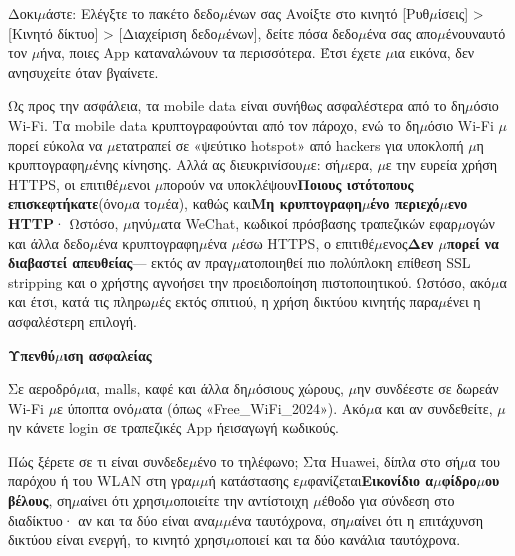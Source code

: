 \begin{tcbpractice}{Δοκι$\mu$άστε: Ελέγξτε το πακέτο δεδο$\mu$ένων σας}
Ανοίξτε στο κινητό [Ρυθ$\mu$ίσεις] > [Κινητό δίκτυο] > [Διαχείριση δεδο$\mu$ένων], δείτε πόσα δεδο$\mu$ένα σας απο$\mu$ένουναυτό τον $\mu$ήνα, ποιες App καταναλώνουν τα περισσότερα. Έτσι έχετε $\mu$ια εικόνα, δεν ανησυχείτε όταν βγαίνετε.

\end{tcbpractice}


Ως προς την ασφάλεια, τα mobile data είναι συνήθως ασφαλέστερα από το δη$\mu$όσιο Wi-Fi. Τα mobile data κρυπτογραφούνται από τον πάροχο, ενώ το δη$\mu$όσιο Wi-Fi $\mu$πορεί εύκολα να $\mu$ετατραπεί σε «ψεύτικο hotspot» από hackers για υποκλοπή $\mu$η κρυπτογραφη$\mu$ένης κίνησης. Αλλά ας διευκρινίσου$\mu$ε: σή$\mu$ερα, $\mu$ε την ευρεία χρήση HTTPS, οι επιτιθέ$\mu$ενοι $\mu$πορούν να υποκλέψουν\textbf{Ποιους ιστότοπους επισκεφτήκατε}(όνο$\mu$α το$\mu$έα), καθώς και\textbf{Μη κρυπτογραφη$\mu$ένο περιεχό$\mu$ενο HTTP}· Ωστόσο, $\mu$ηνύ$\mu$ατα WeChat, κωδικοί πρόσβασης τραπεζικών εφαρ$\mu$ογών και άλλα δεδο$\mu$ένα κρυπτογραφη$\mu$ένα $\mu$έσω HTTPS, ο επιτιθέ$\mu$ενος\textbf{Δεν $\mu$πορεί να διαβαστεί απευθείας}— εκτός αν πραγ$\mu$ατοποιηθεί πιο πολύπλοκη επίθεση SSL stripping και ο χρήστης αγνοήσει την προειδοποίηση πιστοποιητικού. Ωστόσο, ακό$\mu$α και έτσι, κατά τις πληρω$\mu$ές εκτός σπιτιού, η χρήση δικτύου κινητής παρα$\mu$ένει η ασφαλέστερη επιλογή.

\textbf{Υπενθύ$\mu$ιση ασφαλείας}\par

Σε αεροδρό$\mu$ια, malls, καφέ και άλλα δη$\mu$όσιους χώρους, $\mu$ην συνδέεστε σε δωρεάν Wi-Fi $\mu$ε ύποπτα ονό$\mu$ατα (όπως «Free\_WiFi\_2024»). Ακό$\mu$α και αν συνδεθείτε, $\mu$ην κάνετε login σε τραπεζικές App ήεισαγωγή κωδικούς.


Πώς ξέρετε σε τι είναι συνδεδε$\mu$ένο το τηλέφωνο; Στα Huawei, δίπλα στο σή$\mu$α του παρόχου ή του WLAN στη γρα$\mu$$\mu$ή κατάστασης ε$\mu$φανίζεται\textbf{Εικονίδιο α$\mu$φίδρο$\mu$ου βέλους}, ση$\mu$αίνει ότι χρησι$\mu$οποιείτε την αντίστοιχη $\mu$έθοδο για σύνδεση στο διαδίκτυο· αν και τα δύο είναι ανα$\mu$$\mu$ένα ταυτόχρονα, ση$\mu$αίνει ότι η επιτάχυνση δικτύου είναι ενεργή, το κινητό χρησι$\mu$οποιεί και τα δύο κανάλια ταυτόχρονα.

